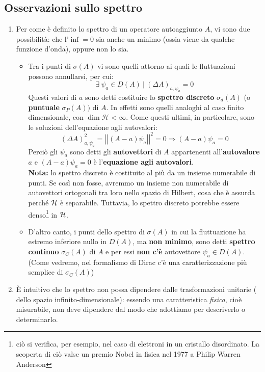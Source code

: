 \documentclass[../../FisicaTeorica.tex]{subfiles}
\begin{document}
\subsection{Osservazioni sullo spettro}
\begin{enumerate}
    \item Per come è definito lo spettro di un operatore autoaggiunto $A$, vi sono due possibilità: che l'$\inf = 0$ sia anche un minimo (ossia viene  da qualche funzione d'onda), oppure non lo sia.
    \begin{itemize}
	\item Tra i punti di $\sigma\left(A\right)$ vi sono quelli attorno ai quali le fluttuazioni possono annullarsi, per cui:
	\[
	\exists\> \psi_a\in D\left(A\right)\>|\>\left(\Delta A\right)_{a,\psi_a}=0
	\]
	Questi valori di $a$ sono detti costituire lo \textbf{spettro discreto} $\sigma_d\left(A\right)$ (o \textbf{puntuale} $\sigma_P(A))$ di $A$. In effetti sono quelli analoghi al caso finito dimensionale, con $\dim{\mathcal{H}}<\infty$. Come questi ultimi, in particolare, sono le soluzioni dell'equazione agli autovalori:
	\[
	\left(\Delta A\right)_{a,\psi_a}^2=\left|\left|\left(A-a\right)\psi_a\right|\right|^2=0\Rightarrow \left(A-a\right)\psi_a=0
	\]
	Perciò gli $\psi_a$ sono detti gli \textbf{autovettori} di $A$ appartenenti all'\textbf{autovalore} $a$ e $\left(A-a\right)\psi_a=0$ è l'\textbf{equazione agli autovalori}.\\
	\textbf{Nota:} lo spettro discreto è costituito al più da un insieme numerabile di punti. Se così non fosse, avremmo un insieme non numerabile di autovettori ortogonali tra loro nello spazio di Hilbert, cosa che è assurda perché $\mathcal{H}$ è separabile. Tuttavia, lo spettro discreto potrebbe essere denso\footnote{ciò si verifica, per esempio, nel caso di elettroni in un cristallo disordinato. La scoperta di ciò valse un premio Nobel in fisica nel 1977 a Philip Warren Anderson} in $\mathcal{H}$.
	\item D'altro canto, i punti dello spettro di $\sigma \left(A\right)$ in cui la fluttuazione ha estremo inferiore nullo in $D(A)$, ma \textbf{non minimo}, sono detti \textbf{spettro continuo} $\sigma_C\left(A\right)$ di $A$ e per essi \textbf{non c'è} autovettore $\psi_a\in D(A)$.\\
	(Come vedremo, nel formalismo di Dirac c'è una caratterizzazione più semplice di $\sigma_C(A)$)\\
	\end{itemize}
	\item È intuitivo che lo spettro non possa dipendere dalle trasformazioni unitarie ( dello spazio infinito-dimensionale): essendo una caratteristica \textit{fisica}, cioè misurabile, non deve dipendere dal modo che adottiamo per descriverlo o determinarlo.\\

\end{enumerate}
\end{document}
